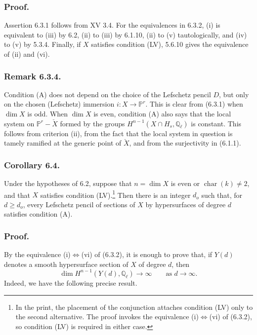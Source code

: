 \subsubsection*{Proof.}
Assertion 6.3.1 follows from XV 3.4.  For the equivalences in 6.3.2,
(i) is equivalent to (iii) by 6.2, (ii) to (iii) by 6.1.10, (ii) to (v)
tautologically, and (iv) to (v) by 5.3.4.  Finally, if $X$ satisfies
condition (LV), 5.6.10 gives the equivalence of (ii) and (vi).

\subsubsection*{Remark 6.3.4.}
Condition (A) does not depend on the choice of the Lefschetz pencil
$D$, but only on the chosen (Lefschetz) immersion
$i:X\longrightarrow\mathbb P^r$.  This is clear from (6.3.1) when
$\dim X$ is odd.  When $\dim X$ is even, condition (A) also says that
the local system on $\mathbb P^r-\check X$ formed by the groups
$H^{n-1}(X\cap H_s,\mathbb Q_\ell)$ is constant.  This follows from
criterion (ii), from the fact that the local system in question is
tamely ramified at the generic point of $\check X$, and from the
surjectivity in (6.1.1).

\subsubsection*{Corollary 6.4.}
Under the hypotheses of 6.2, suppose that
$n=\dim X$ is even or $\operatorname{char}(k)\ne2$, and that $X$
satisfies condition (LV).\footnote{In the print, the placement of the
conjunction attaches condition (LV) only to the second alternative.
The proof invokes the equivalence (i)$\Longleftrightarrow$(vi) of
(6.3.2), so condition (LV) is required in either case.}
Then there is an integer $d_o$ such that, for $d\ge d_o$, every
Lefschetz pencil of sections of $X$ by hypersurfaces of degree $d$
satisfies condition (A).

\subsubsection*{Proof.}
By the equivalence (i)$\Longleftrightarrow$(vi) of (6.3.2), it is
enough to prove that, if $Y(d)$ denotes a smooth hypersurface section of
$X$ of degree $d$, then
\begin{equation}\tag{6.4.1}
\dim H^{n-1}(Y(d),\mathbb Q_\ell)\longrightarrow\infty
\qquad\text{as }d\longrightarrow\infty.
\end{equation}
Indeed, we have the following precise result.

